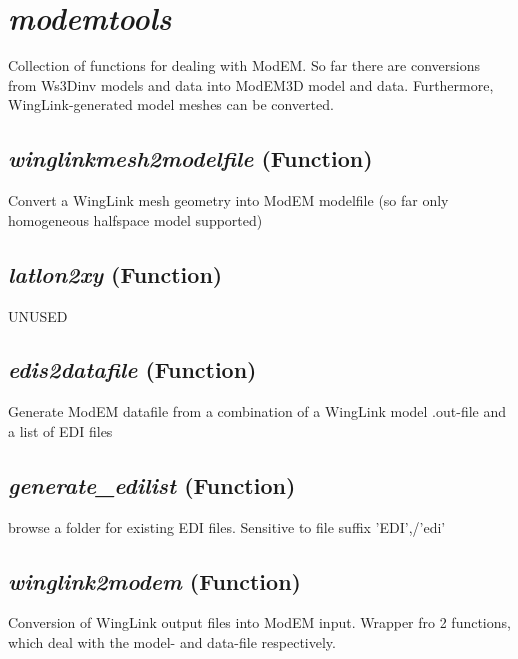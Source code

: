\section{\textit{modemtools} }
\label{sec:modeling.modemtools}

Collection of functions for dealing with ModEM. So far there are conversions from Ws3Dinv models and data into ModEM3D model and data. Furthermore, WingLink-generated model meshes can be converted.

\subsection{\textit{winglinkmesh2modelfile} (Function)}
\label{ssec:.modeling.modemtools.winglinkmesh2modelfile}

Convert a WingLink mesh geometry into ModEM modelfile (so far only homogeneous halfspace model supported)


\subsection{\textit{latlon2xy} (Function)}
\label{ssec:.modeling.modemtools.latlon2xy}

UNUSED

\subsection{\textit{edis2datafile} (Function)}
\label{ssec:.modeling.modemtools.edis2datafile}

Generate ModEM datafile from a combination of a WingLink model .out-file and a list of EDI files

\subsection{\textit{generate\_edilist} (Function)}
\label{ssec:.modeling.modemtools.generate_edilist}

browse a folder for existing EDI files. Sensitive to file suffix 'EDI',/'edi'

\subsection{\textit{winglink2modem} (Function)}
\label{ssec:.modeling.modemtools.winglink2modem}

    Conversion of WingLink output files into ModEM input. Wrapper fro 2 functions, which deal with the model- and data-file respectively.


